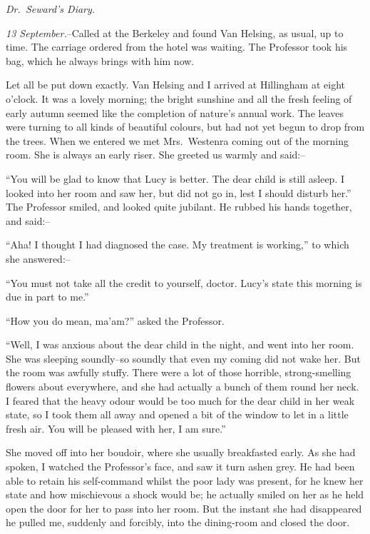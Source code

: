 \documentclass[12pt,openright]{book}
\begin{document}
\textit{Dr. Seward’s Diary.}

\textit{13 September.}–Called at the Berkeley and found Van Helsing, as usual, up to time. The carriage ordered from the hotel was waiting. The Professor took his bag, which he always brings with him now.

Let all be put down exactly. Van Helsing and I arrived at Hillingham at eight o’clock. It was a lovely morning; the bright sunshine and all the fresh feeling of early autumn seemed like the completion of nature’s annual work. The leaves were turning to all kinds of beautiful colours, but had not yet begun to drop from the trees. When we entered we met Mrs. Westenra coming out of the morning room. She is always an early riser. She greeted us warmly and said:–

“You will be glad to know that Lucy is better. The dear child is still asleep. I looked into her room and saw her, but did not go in, lest I should disturb her.” The Professor smiled, and looked quite jubilant. He rubbed his hands together, and said:–

“Aha! I thought I had diagnosed the case. My treatment is working,” to which she answered:–

“You must not take all the credit to yourself, doctor. Lucy’s state this morning is due in part to me.”

“How you do mean, ma’am?” asked the Professor.

“Well, I was anxious about the dear child in the night, and went into her room. She was sleeping soundly–so soundly that even my coming did not wake her. But the room was awfully stuffy. There were a lot of those horrible, strong-smelling flowers about everywhere, and she had actually a bunch of them round her neck. I feared that the heavy odour would be too much for the dear child in her weak state, so I took them all away and opened a bit of the window to let in a little fresh air. You will be pleased with her, I am sure.”

She moved off into her boudoir, where she usually breakfasted early. As she had spoken, I watched the Professor’s face, and saw it turn ashen grey. He had been able to retain his self-command whilst the poor lady was present, for he knew her state and how mischievous a shock would be; he actually smiled on her as he held open the door for her to pass into her room. But the instant she had disappeared he pulled me, suddenly and forcibly, into the dining-room and closed the door.
\end{document}
